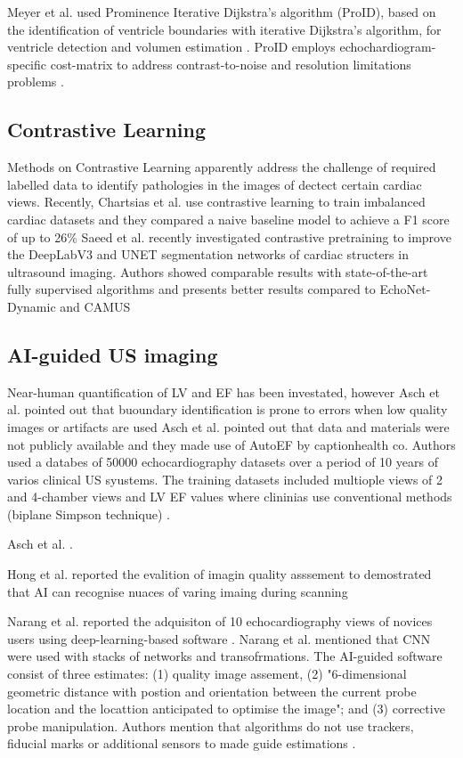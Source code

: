 Meyer et al. used Prominence Iterative Dijkstra’s algorithm (ProID), based on the identification of ventricle boundaries with iterative Dijkstra's algorithm, for ventricle detection and volumen estimation \cite{Meyers2020}.
ProID employs echochardiogram-specific cost-matrix to address contrast-to-noise and resolution limitations problems \cite{brindise2020unsupervised}.


\subsection{Contrastive Learning}
Methods on Contrastive Learning apparently address the challenge of required labelled data to identify pathologies in the images of dectect certain cardiac views.
Recently, Chartsias et al. use contrastive learning to train imbalanced cardiac datasets and they compared a naive baseline model to achieve a F1 score of up to 26\% \cite{chartsias2021-ASMUS}
Saeed et al. recently investigated contrastive pretraining to improve the DeepLabV3 and UNET segmentation networks of cardiac structers in ultrasound imaging.
Authors showed comparable results with state-of-the-art fully supervised algorithms and presents better results compared to EchoNet-Dynamic and CAMUS \cite{saeed2021MIDL}





\subsection{AI-guided US imaging}

Near-human quantification of LV and EF has been investated, however Asch et al. pointed out that buoundary identification is prone to errors when low quality images or artifacts are used
Asch et al. pointed out that data and materials were not publicly available and they made use of AutoEF by captionhealth co.
Authors used a databes of 50000 echocardiography datasets over a period of 10 years of varios clinical US syustems. 
The training datasets included multiople views of 2 and 4-chamber views and LV EF values where clininias use conventional methods (biplane Simpson technique) \cite{asch2019CIRIMAGING}.

Asch et al. \cite{asch2021CircImaging}.

Hong et al. reported the evalition of imagin quality asssement to demostrated that AI can recognise nuaces of varing imaing during scanning \cite{hong2021JACC}


Narang et al. reported the adquisiton of 10 echocardiography views of novices users using deep-learning-based software \cite{Narang2021JAMACARDIOLOGY}.
Narang et al. mentioned that CNN were used with stacks of networks and transofrmations. 
The AI-guided software consist of three estimates: (1) quality image assement, (2) "6-dimensional geometric distance with postion and orientation between the current probe location and the locattion anticipated to optimise the image"; and (3) corrective probe manipulation. \cite{Narang2021JAMACARDIOLOGY}
Authors mention that algorithms do not use trackers, fiducial marks or additional sensors to made guide estimations \cite{Narang2021JAMACARDIOLOGY}.


